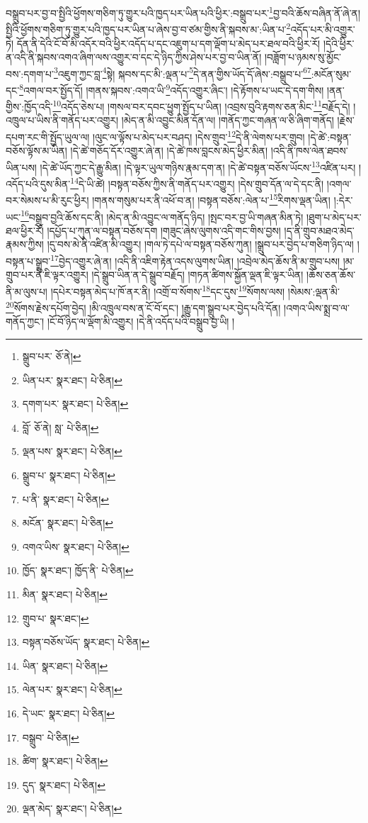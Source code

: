 བསྒྲུབ་པར་བྱ་བ་སྤྱིའི་ཕྱོགས་གཅིག་ཏུ་གྱུར་པའི་ཁྱད་པར་ཡིན་པའི་ཕྱིར་:བསྒྲུབ་པར་\footnote{སྒྲུབ་པར་  ཅོ་ནེ། }བྱ་བའི་ཆོས་བཞིན་ནོ་ཞེ་ན། སྤྱིའི་ཕྱོགས་གཅིག་ཏུ་གྱུར་པའི་ཁྱད་པར་ཡིན་པ་ཞེས་བྱ་བ་ཙམ་གྱིས་ནི་སྐབས་མ་:ཡིན་པ་\footnote{ཡིན་པར་  སྣར་ཐང་།  པེ་ཅིན། }འདོད་པར་མི་འགྱུར་ཏེ། དོན་ནི་དེའི་ངོ་བོ་མི་འདོར་བའི་ཕྱིར་འདོད་པ་དང་འཇུག་པ་དག་ལྡོག་པ་མེད་པར་ཐལ་བའི་ཕྱིར་རོ། །དེའི་ཕྱིར་ན་འདི་ནི་སྐབས་འགའ་ཞིག་ལས་འགྱུར་བ་དང་དེ་ཉིད་ཀྱིས་ཤེས་པར་བྱ་བ་ཡིན་ནོ། །བཟློག་པ་ཉམས་སུ་མྱོང་བས་:དགག་པ་\footnote{དགག་པར་  སྣར་ཐང་།  པེ་ཅིན། }འཇུག་ཀྱང་བླ་\footnote{བློ་  ཅོ་ནེ། སླ་  པེ་ཅིན། }སྟེ། སྐབས་དང་མི་:ལྡན་པ་\footnote{ལྡན་པས་  སྣར་ཐང་།  པེ་ཅིན། }དེ་ནན་གྱིས་ཡོད་དོ་ཞེས་:བསྒྲུབ་པ་\footnote{སྒྲུབ་པ་  སྣར་ཐང་།  པེ་ཅིན། }\footnote{པ་ནི་  སྣར་ཐང་།  པེ་ཅིན། }:མངོན་སུམ་དང་\footnote{མངོན་  སྣར་ཐང་།  པེ་ཅིན། }འགལ་བར་སྤྱོད་དོ། །གནས་སྐབས་:འགའ་ཡི་\footnote{འགའ་ཡིས་  སྣར་ཐང་།  པེ་ཅིན། }འདོད་འགྱུར་ཞིང་། །དེ་རྟོགས་པ་ཡང་དེ་དག་གིས། །ནན་གྱིས་:ཁྱོད་འདི་\footnote{ཁྱོད་  སྣར་ཐང་། ཁྱོད་ནི་  པེ་ཅིན། }འདོད་ཅེས་པ། །གསལ་བར་དབང་ཕྱུག་སྤྱོད་པ་ཡིན། །འབྲས་བུའི་རྟགས་ཅན་མིང་\footnote{མིན་  སྣར་ཐང་།  པེ་ཅིན། }བརྗོད་དེ། །འཁྲུལ་པ་ཡིས་ནི་གནོད་པར་འགྱུར། །མེད་ན་མི་འབྱུང་མིན་དོན་ལ། །གནོད་ཀྱང་གཞན་ལ་ཅི་ཞིག་གནོད། །རྗེས་དཔག་རང་གི་སྤྱོད་ཡུལ་ལ། །ལུང་ལ་ལྟོས་པ་མེད་པར་བཤད། །དེས་གྲུབ་\footnote{གྲུབ་པ་  སྣར་ཐང་། }དེ་ནི་ལེགས་པར་གྲུབ། །དེ་ཚེ་:བསྟན་བཅོས་ལྟོས་མ་ཡིན། །དེ་ཚེ་གཅོད་དོར་འགྱུར་ཞེ་ན། །དེ་ཚེ་ཁས་བླངས་མེད་ཕྱིར་མིན། །འདི་ནི་ཁས་ལེན་ཐབས་ཡིན་པས། །དེ་ཚེ་ཡོད་ཀྱང་དེ་རྒྱུ་མིན། །དེ་ལྟར་ཡུལ་གཉིས་རྣམ་དག་ན། །དེ་ཚེ་བསྟན་བཅོས་ཡོངས་\footnote{བསྟན་བཅོས་ཡོད་  སྣར་ཐང་།  པེ་ཅིན། }འཛིན་པར། །འདོད་པའི་དུས་མིན་\footnote{ཡིན་  སྣར་ཐང་།  པེ་ཅིན། }དེ་ཡི་ཚེ། །བསྟན་བཅོས་ཀྱིས་ནི་གནོད་པར་འགྱུར། །དེས་གྲུབ་དོན་ལ་དེ་དང་ནི། །འགལ་བར་སེམས་པ་མི་རུང་ཕྱིར། །གནས་གསུམ་པར་ནི་འཕོ་བ་ན། །བསྟན་བཅོས་:ལེན་པ་\footnote{ལེན་པར་  སྣར་ཐང་།  པེ་ཅིན། }རིགས་ལྡན་ཡིན། །:དེར་ཡང་\footnote{དེ་ཡང་  སྣར་ཐང་།  པེ་ཅིན། }བསྒྲུབ་བྱའི་ཆོས་དང་ནི། །མེད་ན་མི་འབྱུང་ལ་གནོད་ཉིད། །སྤང་བར་བྱ་ཡི་གཞན་མིན་ཏེ། །ཐུག་པ་མེད་པར་ཐལ་ཕྱིར་རོ། །དཔྱོད་པ་ཀུན་ལ་བསྟན་བཅོས་དག །གཟུང་ཞེས་ལུགས་འདི་གང་གིས་བྱས། །ད་ནི་གྲུབ་མཐའ་མེད་རྣམས་ཀྱིས། །དུ་བས་མེ་ནི་འཛིན་མི་འགྱུར། །གལ་ཏེ་དཔེ་ལ་བསྟན་བཅོས་ཀུན། །སྒྲུབ་པར་བྱེད་པ་གཅིག་ཉིད་ལ། །བསྟན་པ་སྒྲུབ་\footnote{བསྒྲུབ་  པེ་ཅིན། }བྱེད་འགྱུར་ཞེ་ན། །འདི་ནི་འཇིག་རྟེན་འདས་ལུགས་ཡིན། །འབྲེལ་མེད་ཆོས་ནི་མ་གྲུབ་པས། །མ་གྲུབ་པར་ནི་ཇི་ལྟར་འགྱུར། །དེ་སྒྲུབ་ཡིན་ན་དེ་སྒྲུབ་བརྗོད། །གཏན་ཚིགས་སྐྱོན་ལྡན་ཇི་ལྟར་ཡིན། །ཆོས་ཅན་ཆོས་ནི་མ་ལུས་པ། །དཔེར་བསྟན་མེད་པ་ཁོ་ནར་ནི། །འགྲོ་བ་སོགས་\footnote{ཚིག་  སྣར་ཐང་།  པེ་ཅིན། }དང་དུས་\footnote{དུད་  སྣར་ཐང་།  པེ་ཅིན། }སོགས་ལས། །སེམས་:ལྡན་མི་\footnote{ལྡན་མེད་  སྣར་ཐང་།  པེ་ཅིན། }སོགས་རྗེས་དཔོག་བྱེད། །མི་འཁྲུལ་བས་ན་ངོ་བོ་དང་། །རྒྱུ་དག་སྒྲུབ་པར་བྱེད་པའི་དོན། །འགའ་ཡིས་སྨྲ་བ་ལ་གནོད་ཀྱང་། །ངོ་བོ་ཉིད་ལ་ལྡོག་མི་འགྱུར། །དེ་ནི་འདོད་པའི་བསྒྲུབ་བྱ་ཡི། །
